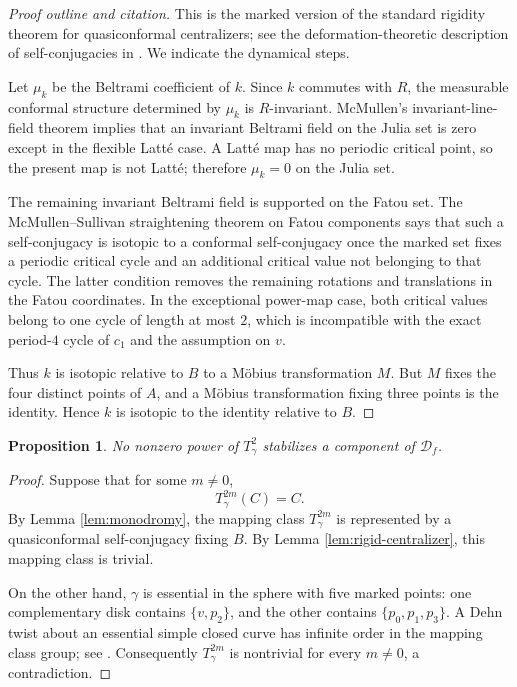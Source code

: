 \documentclass[11pt]{article}
\newcommand{\D}{\mathcal D}
\newtheorem{proposition}[theorem]{Proposition}
\theoremstyle{remark}
\begin{document}
\begin{proof}[Proof outline and citation]
This is the marked version of the standard rigidity theorem for
quasiconformal centralizers; see the deformation-theoretic
description of self-conjugacies in \cite{McMullenSullivan}.  We
indicate the dynamical steps.

Let \(\mu_k\) be the Beltrami coefficient of \(k\).  Since \(k\)
commutes with \(R\), the measurable conformal structure determined
by \(\mu_k\) is \(R\)-invariant.  McMullen's invariant-line-field
theorem \cite[Chapter 3]{McMullenBook} implies that an invariant
Beltrami field on the Julia set is zero except in the flexible
Latt\'e case.  A Latt\'e map has no periodic critical point, so the
present map is not Latt\'e; therefore \(\mu_k=0\) on the Julia set.

The remaining invariant Beltrami field is supported on the Fatou
set.  The McMullen--Sullivan straightening theorem on Fatou
components says that such a self-conjugacy is isotopic to a
conformal self-conjugacy once the marked set fixes a periodic
critical cycle and an additional critical value not belonging to
that cycle.  The latter condition removes the remaining rotations
and translations in the Fatou coordinates.  In the exceptional
power-map case, both critical values belong to one cycle of length
at most \(2\), which is incompatible with the exact period-\(4\)
cycle of \(c_1\) and the assumption on \(v\).

Thus \(k\) is isotopic relative to \(B\) to a M\"obius
transformation \(M\).  But \(M\) fixes the four distinct points of
\(A\), and a M\"obius transformation fixing three points is the
identity.  Hence \(k\) is isotopic to the identity relative to
\(B\).
\end{proof}

\begin{proposition}\label{prop:no-component-stabilized}
No nonzero power of \(T_\gamma^2\) stabilizes a component of
\(\D_f\).
\end{proposition}

\begin{proof}
Suppose that for some \(m\neq0\),
\[
T_\gamma^{2m}(C)=C.
\]
By Lemma \ref{lem:monodromy}, the mapping class \(T_\gamma^{2m}\)
is represented by a quasiconformal self-conjugacy fixing \(B\).
By Lemma \ref{lem:rigid-centralizer}, this mapping class is trivial.

On the other hand, \(\gamma\) is essential in the sphere with five
marked points: one complementary disk contains \(\{v,p_2\}\), and
the other contains \(\{p_0,p_1,p_3\}\).  A Dehn twist about an
essential simple closed curve has infinite order in the mapping
class group; see \cite[Chapter 3]{FarbMargalit}.  Consequently
\(T_\gamma^{2m}\) is nontrivial for every \(m\neq0\), a
contradiction.
\end{proof}
\end{document}
